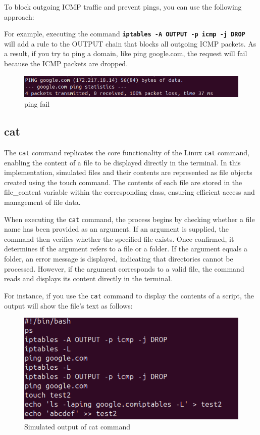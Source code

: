 To block outgoing ICMP traffic and prevent pings, you can use the following approach:

For example, executing the command \textbf{\texttt{iptables -A OUTPUT -p icmp -j DROP}} will add a rule to the OUTPUT chain that blocks all outgoing ICMP packets. As a result, if you try to ping a domain, like ping google.com, the request will fail because the ICMP packets are dropped.

\begin{figure}[H]
    \centering
    \includegraphics[width=1\linewidth]{bilder/ping_fail.PNG}
    \caption{ping fail}
\end{figure}

\subsection{cat}
\label{sub:cat}
The \texttt{cat} command replicates the core functionality of the Linux \texttt{cat} command, enabling the content of a file to be displayed directly in the terminal. In this implementation, simulated files and their contents are represented as file objects created using the touch command. The contents of each file are stored in the file\_content variable within the corresponding class, ensuring efficient access and management of file data.

When executing the \texttt{cat} command, the process begins by checking whether a file name has been provided as an argument. If an argument is supplied, the command then verifies whether the specified file exists. Once confirmed, it determines if the argument refers to a file or a folder. If the argument equals a folder, an error message is displayed, indicating that directories cannot be processed. However, if the argument corresponds to a valid file, the command reads and displays its content directly in the terminal.

For instance, if you use the \texttt{cat} command to display the contents of a script, the output will show the file's text as follows:

\begin{figure}[H]
    \centering
    \includegraphics[width=1\linewidth]{bilder/cat.PNG}
    \caption{Simulated output of cat command}
\end{figure}

